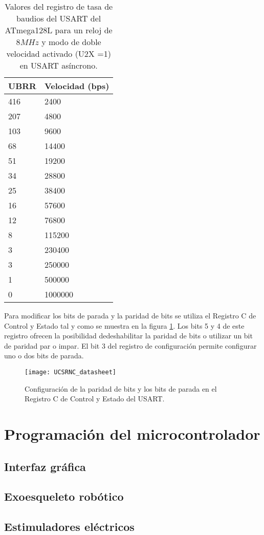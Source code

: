 \begin{table}
\centering
\begin{tabular}{| p{20mm} | p{30 mm} |}
\hline
\textbf{UBRR} & \textbf{Velocidad (bps)} \\ \hline
416 & 2400\\ \hline
207 & 4800\\ \hline
103 & 9600\\ \hline
68 & 14400\\ \hline
51 & 19200\\ \hline
34 & 28800\\ \hline
25 & 38400\\ \hline
16 & 57600\\ \hline
12 & 76800\\ \hline
8 & 115200\\ \hline
3 & 230400\\ \hline
3 & 250000\\ \hline
1 & 500000\\ \hline
0 & 1000000\\ \hline
\end{tabular}\caption{Valores del registro de tasa de baudios del USART del ATmega128L para un reloj de $8MHz$ y modo de doble velocidad activado (U2X =1) en USART asíncrono.}\label{tabla:velocidades_USART}
\end{table}

Para modificar los bits de parada y la paridad de bits se utiliza el Registro C de Control y Estado tal y como se muestra en la figura \ref{fig:UCSRNC_datasheet}. Los bits 5 y 4 de este registro ofrecen la posibilidad dedeshabilitar la paridad de bits o utilizar un bit de paridad par o impar. El bit 3 del registro de configuración permite configurar uno o dos bits de parada.\\

\begin{figure}[!htb]
\centering
\texttt{[image: UCSRNC\_datasheet]}
  \caption{Configuración de la paridad de bits y los bits de parada en el Registro C de Control y Estado del USART.}\label{fig:UCSRNC_datasheet}
\end{figure}


\section{Programación del microcontrolador}
\subsection{Interfaz gráfica}
\subsection{Exoesqueleto robótico}
\subsection{Estimuladores eléctricos}
